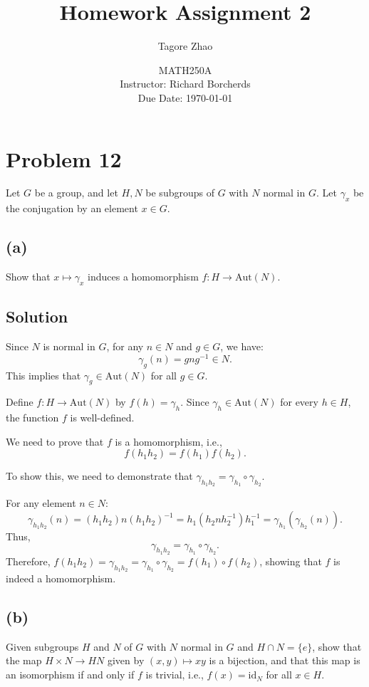 \documentclass[12pt]{article}
\title{Homework Assignment 2}
\author{Tagore Zhao}
\date{MATH250A \\ Instructor: Richard Borcherds \\ Due Date: \today}
\begin{document}
\maketitle

\section*{Problem 12}
Let \( G \) be a group, and let \( H, N \) be subgroups of \( G \) with \( N \) normal in \( G \). Let \( \gamma_x \) be the conjugation by an element \( x \in G \).

\subsection*{(a)}
Show that \( x \mapsto \gamma_x \) induces a homomorphism \( f: H \to \text{Aut}(N) \).

\subsection*{Solution}

Since \( N \) is normal in \( G \), for any \( n \in N \) and \( g \in G \), we have:
\[
\gamma_g(n) = gng^{-1} \in N.
\]
This implies that \( \gamma_g \in \text{Aut}(N) \) for all \( g \in G \). 

Define \( f: H \to \text{Aut}(N) \) by \( f(h) = \gamma_h \). Since \( \gamma_h \in \text{Aut}(N) \) for every \( h \in H \), the function \( f \) is well-defined.

We need to prove that \( f \) is a homomorphism, i.e., 
\[
f(h_1h_2) = f(h_1)f(h_2).
\]

To show this, we need to demonstrate that \( \gamma_{h_1h_2} = \gamma_{h_1} \circ \gamma_{h_2} \).

For any element \( n \in N \):
\[
\gamma_{h_1h_2}(n) = (h_1h_2) n (h_1h_2)^{-1} = h_1 (h_2 n h_2^{-1}) h_1^{-1} = \gamma_{h_1}(\gamma_{h_2}(n)).
\]
Thus,
\[
\gamma_{h_1h_2} = \gamma_{h_1} \circ \gamma_{h_2}.
\]
Therefore, \( f(h_1h_2) = \gamma_{h_1h_2} = \gamma_{h_1} \circ \gamma_{h_2} = f(h_1) \circ f(h_2) \), showing that \( f \) is indeed a homomorphism.

\subsection*{(b)}
Given subgroups \( H \) and \( N \) of \( G \) with \( N \) normal in \( G \) and \( H \cap N = \{e\} \), show that the map \( H \times N \to HN \) given by \( (x, y) \mapsto xy \) is a bijection, and that this map is an isomorphism if and only if \( f \) is trivial, i.e., \( f(x) = \text{id}_N \) for all \( x \in H \).
\end{document}
